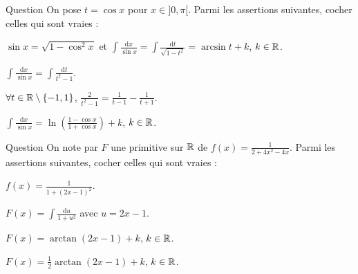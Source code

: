 \begin{multi}[multiple,feedback=
{Avec \(t=\cos x\), on a : \(\mathrm{d}t=-\sin x\mathrm{d}x\) et 
\[\int \frac{\mathrm{d}x}{\sin x}=\int \frac{\sin x\mathrm{d}x}{\sin ^2x}=\int \frac{-\mathrm{d}t}{1-t^2}=\int \frac{\mathrm{d}t}{t^2-1}.\]
Or, \(\displaystyle \frac{2}{t^2-1}=\frac{1}{t-1}-\frac{1}{t+1}\). Donc
\(\displaystyle \int \frac{\mathrm{d}x}{\sin x}=\frac{1}{2}\ln \left(\frac{1-t}{1+t}\right)+k\), \(k\in \Rr\).
}]{Question}
On pose \(t=\cos x\) pour \(x\in ]0,\pi[\). Parmi les assertions suivantes, cocher celles qui sont vraies :

    \item \(\sin x=\sqrt{1-\cos ^2x}\) et \(\displaystyle \int \frac{\mathrm{d}x}{\sin x}=\int \frac{\mathrm{d}t}{\sqrt{1-t^2}}=\arcsin t+k\), \(k\in \Rr\).
    \item* \(\displaystyle \int \frac{\mathrm{d}x}{\sin x}=\int \frac{\mathrm{d}t}{t^2-1}\).
    \item* \(\forall t\in \mathbb{R}\setminus \{-1,1\}\), \(\displaystyle \frac{2}{t^2-1}=\frac{1}{t-1}-\frac{1}{t+1}\).
    \item \(\displaystyle \int \frac{\mathrm{d}x}{\sin x}=\ln \left(\frac{1-\cos x}{1+\cos x}\right)+k\), \(k\in \Rr\).
\end{multi}


\begin{multi}[multiple,feedback=
{On a : \(2+4x^2-4x=1+(2x-1)^2\) et avec \(u=2x-1\), on a : \(\mathrm{d}u=2\mathrm{d}x\) et 
\[F(x)=\frac{1}{2}\int \frac{\mathrm{d}u}{1+u^2}=\frac{1}{2}\arctan u+k=\frac{1}{2}\arctan (2x-1)+k,\; k\in \Rr.\]
}]{Question}
On note par \(F\) une primitive sur \(\mathbb{R}\) de \(\displaystyle f(x)=\frac{1}{2+4x^2-4x}\). Parmi les assertions suivantes, cocher celles qui sont vraies :

    \item* \(\displaystyle f(x)=\frac{1}{1+(2x-1)^2}\).
    \item \(\displaystyle F(x)=\int \frac{\mathrm{d}u}{1+u^2}\) avec \(u=2x-1\).
    \item \(\displaystyle F(x)=\arctan (2x-1)+k\), \(k\in \Rr\).
    \item* \(\displaystyle F(x)=\frac{1}{2}\arctan (2x-1)+k\),\; \(k\in \Rr\).
\end{multi}


